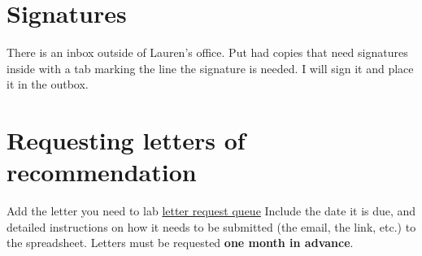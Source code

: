 \documentclass[12pt]{article}
\begin{document}
\section{Signatures}
There is an inbox outside of Lauren's office. Put had copies that need
signatures inside with a tab marking the line the signature is
needed. I will sign it and place it in the outbox.

\section{Requesting letters of recommendation}
Add the letter you need to lab
\href{https://docs.google.com/spreadsheets/d/1Of_AYtKQUZFwdj1hKwn0gYwD2m2cYB6bwNxYEiThTE0/edit?usp=sharing}{letter request queue}
Include the date it is due, and detailed instructions on how it
needs to be submitted (the email, the link, etc.) to the
spreadsheet. Letters must be requested \textbf{one month in advance}.
\end{document}
